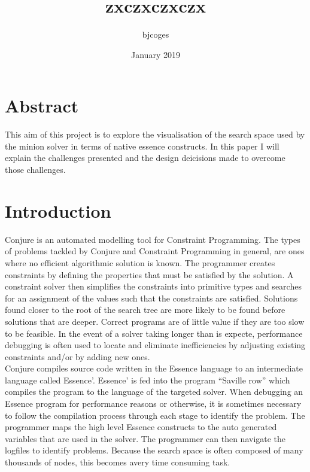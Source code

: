 \documentclass{article}
\title{zxczxczxczx}
\author{bjcoges }
\date{January 2019}
\begin{document}
\maketitle

\section{Abstract}
This aim of this project is to explore the visualisation of the search space used by the minion solver in terms of native essence constructs. In this paper I will explain the challenges presented and the design deicisions made to overcome those challenges.


\section{Introduction}

Conjure is an automated modelling tool for Constraint Programming. The types of problems tackled by Conjure and Constraint Programming in general, are ones where no efficient algorithmic solution is known. The programmer creates constraints by defining the properties that must be satisfied by the solution. A constraint solver then simplifies the constraints into primitive types and searches for an assignment of the values such that the constraints are satisfied. Solutions found closer to the root of the search tree are more likely to be found before solutions that are deeper. Correct programs are of little value if they are too slow to be feasible. In the event of a solver taking longer than is expecte, performance debugging is often used to locate and eliminate inefficiencies by adjusting existing constraints and/or by adding new ones. \\

Conjure compiles source code written in the Essence language to an intermediate language called Essence’. Essence’ is fed into the program “Saville row” which compiles the program to the language of the targeted solver. When debugging an Essence program for performance reasons or otherwise, it is sometimes necessary to follow the compilation process through each stage to identify the problem. 
The programmer maps the high level Essence constructs to the auto generated variables that are used in the solver. The programmer can then navigate the logfiles to identify problems. Because the search space is often composed of many thousands of nodes, this becomes avery time consuming task. \\
\end{document}
